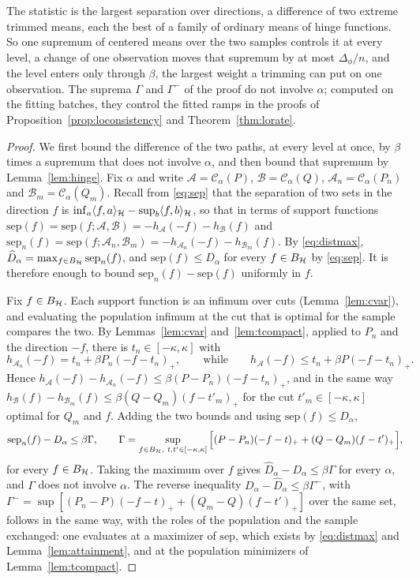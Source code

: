 The statistic is the largest separation over directions, a difference of two extreme trimmed means, each the best of
a family of ordinary means of hinge functions. So one supremum of centered means over the two samples controls it at
every level, a change of one observation moves that supremum by at most $\Delta_\phi/n$, and the level enters only
through $\beta$, the largest weight a trimming can put on one observation. The suprema $\Gamma$ and $\Gamma^-$ of the proof do not involve $\alpha$; computed on the fitting batches,
they control the fitted ramps in the proofs of Proposition~\ref{prop:loconsistency} and Theorem~\ref{thm:lorate}.

\begin{proof}
We first bound the difference of the two paths, at every level at once, by $\beta$ times a supremum that does not
involve $\alpha$, and then bound that supremum by Lemma~\ref{lem:hinge}. Fix $\alpha$ and write
$\mathcal A=\mathcal C_\alpha(P)$, $\mathcal B=\mathcal C_\alpha(Q)$, $\mathcal A_n=\mathcal C_\alpha(P_n)$ and
$\mathcal B_m=\mathcal C_\alpha(Q_m)$. Recall from \eqref{eq:sep} that the separation of two sets in the direction $f$ is
$\inf_a\langle f,a\rangle_{\mathcal{H}}-\sup_b\langle f,b\rangle_{\mathcal{H}}$, so that in terms of support functions
$\mathrm{sep}(f)=\mathrm{sep}(f;\mathcal A,\mathcal B)=-h_{\mathcal A}(-f)-h_{\mathcal B}(f)$ and
$\mathrm{sep}_n(f)=\mathrm{sep}(f;\mathcal A_n,\mathcal B_m)=-h_{\mathcal A_n}(-f)-h_{\mathcal B_m}(f)$.
By \eqref{eq:distmax}, $\widehat D_\alpha=\max_{f\in B_{\mathcal{H}}}\mathrm{sep}_n(f)$, and $\mathrm{sep}(f)\le D_\alpha$ for every
$f\in B_{\mathcal{H}}$ by \eqref{eq:sep}. It is therefore enough to bound $\mathrm{sep}_n(f)-\mathrm{sep}(f)$ uniformly in $f$.

Fix $f\in B_{\mathcal{H}}$. Each support function is an infimum over cuts (Lemma~\ref{lem:cvar}), and evaluating the population
infimum at the cut that is optimal for the sample compares the two. By Lemmas~\ref{lem:cvar} and~\ref{lem:tcompact},
applied to $P_n$ and the direction $-f$, there is $t_n\in[-\kappa,\kappa]$ with
\[
h_{\mathcal A_n}(-f)=t_n+\beta P_n(-f-t_n)_+,
\qquad\text{while}\qquad
h_{\mathcal A}(-f)\le t_n+\beta P(-f-t_n)_+ .
\]
Hence $h_{\mathcal A}(-f)-h_{\mathcal A_n}(-f)\le\beta(P-P_n)(-f-t_n)_+$, and in the same way
$h_{\mathcal B}(f)-h_{\mathcal B_m}(f)\le\beta(Q-Q_m)(f-t'_m)_+$ for the cut $t'_m\in[-\kappa,\kappa]$ optimal for $Q_m$
and $f$. Adding the two bounds and using $\mathrm{sep}(f)\le D_\alpha$,
\[
\mathrm{sep}_n(f)-D_\alpha\le\beta\Gamma,
\qquad
\Gamma=\sup_{f\in B_\Hh,\ t,t'\in[-\kappa,\kappa]}\Big[(P-P_n)(-f-t)_++(Q-Q_m)(f-t')_+\Big],
\]
for every $f\in B_{\mathcal{H}}$. Taking the maximum over $f$ gives $\widehat D_\alpha-D_\alpha\le\beta\Gamma$ for every $\alpha$,
and $\Gamma$ does not involve $\alpha$. The reverse inequality $D_\alpha-\widehat D_\alpha\le\beta\Gamma^-$, with
$\Gamma^-=\sup[(P_n-P)(-f-t)_++(Q_m-Q)(f-t')_+]$ over the same set, follows in the same way, with the roles of the
population and the sample exchanged: one evaluates at a maximizer of $\mathrm{sep}$, which exists by \eqref{eq:distmax}
and Lemma~\ref{lem:attainment}, and at the population minimizers of Lemma~\ref{lem:tcompact}.


\end{proof}
